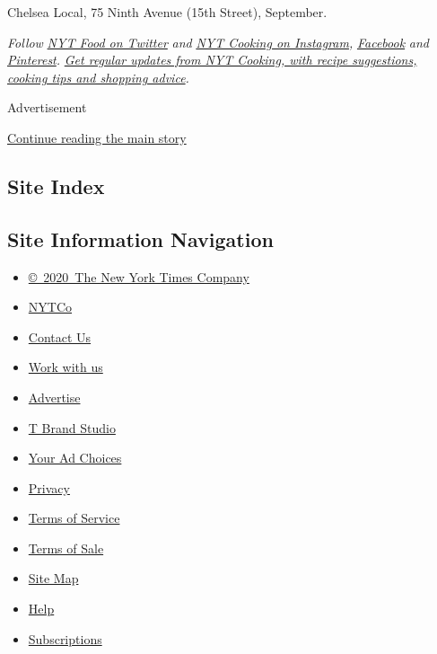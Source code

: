 Chelsea Local, 75 Ninth Avenue (15th Street), September.

\emph{Follow} \href{https://twitter.com/nytfood}{\emph{NYT Food on
Twitter}} \emph{and}
\href{https://www.instagram.com/nytcooking/}{\emph{NYT Cooking on
Instagram}}\emph{,}
\href{https://www.facebookcorewwwi.onion/nytcooking/}{\emph{Facebook}}
\emph{and}
\href{https://www.pinterest.com/nytcooking/}{\emph{Pinterest}}\emph{.}
\href{https://www.nytimes3xbfgragh.onion/newsletters/cooking}{\emph{Get
regular updates from NYT Cooking, with recipe suggestions, cooking tips
and shopping advice}}\emph{.}

Advertisement

\protect\hyperlink{after-bottom}{Continue reading the main story}

\hypertarget{site-index}{%
\subsection{Site Index}\label{site-index}}

\hypertarget{site-information-navigation}{%
\subsection{Site Information
Navigation}\label{site-information-navigation}}

\begin{itemize}
\tightlist
\item
  \href{https://help.nytimes3xbfgragh.onion/hc/en-us/articles/115014792127-Copyright-notice}{©~2020~The
  New York Times Company}
\end{itemize}

\begin{itemize}
\tightlist
\item
  \href{https://www.nytco.com/}{NYTCo}
\item
  \href{https://help.nytimes3xbfgragh.onion/hc/en-us/articles/115015385887-Contact-Us}{Contact
  Us}
\item
  \href{https://www.nytco.com/careers/}{Work with us}
\item
  \href{https://nytmediakit.com/}{Advertise}
\item
  \href{http://www.tbrandstudio.com/}{T Brand Studio}
\item
  \href{https://www.nytimes3xbfgragh.onion/privacy/cookie-policy\#how-do-i-manage-trackers}{Your
  Ad Choices}
\item
  \href{https://www.nytimes3xbfgragh.onion/privacy}{Privacy}
\item
  \href{https://help.nytimes3xbfgragh.onion/hc/en-us/articles/115014893428-Terms-of-service}{Terms
  of Service}
\item
  \href{https://help.nytimes3xbfgragh.onion/hc/en-us/articles/115014893968-Terms-of-sale}{Terms
  of Sale}
\item
  \href{https://spiderbites.nytimes3xbfgragh.onion}{Site Map}
\item
  \href{https://help.nytimes3xbfgragh.onion/hc/en-us}{Help}
\item
  \href{https://www.nytimes3xbfgragh.onion/subscription?campaignId=37WXW}{Subscriptions}
\end{itemize}

